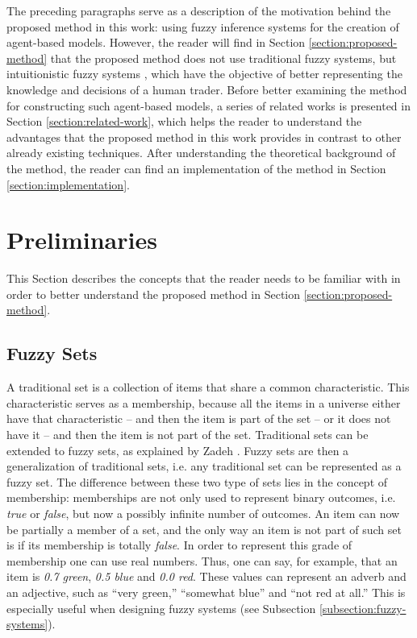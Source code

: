 \documentclass[review]{elsarticle}
\begin{document}
The preceding paragraphs serve as a description of the motivation behind the proposed method in this work: using fuzzy inference systems for the creation of agent-based models. However, the reader will find in Section \ref{section:proposed-method} that the proposed method does not use traditional fuzzy systems, but intuitionistic fuzzy systems \cite{Atanassov1986}, which have the objective of better representing the knowledge and decisions of a human trader. Before better examining the method for constructing such agent-based models, a series of related works is presented in Section \ref{section:related-work}, which helps the reader to understand the advantages that the proposed method in this work provides in contrast to other already existing techniques. After understanding the theoretical background of the method, the reader can find an implementation of the method in Section \ref{section:implementation}.
%

\section{Preliminaries}
\label{section:preliminaries}
%

This Section describes the concepts that the reader needs to be familiar with in order to better understand the proposed method in Section \ref{section:proposed-method}.%

\subsection{Fuzzy Sets}
\label{subsection:fuzzy-sets}

A traditional set is a collection of items that share a common characteristic. This characteristic serves as a membership, because all the items in a universe either have that characteristic -- and then the item is part of the set -- or it does not have it -- and then the item is not part of the set. Traditional sets can be extended to fuzzy sets, as explained by Zadeh \cite{Zadeh1965}. Fuzzy sets are then a generalization of traditional sets, i.e. any traditional set can be represented as a fuzzy set. The difference between these two type of sets lies in the concept of membership: memberships are not only used to represent binary outcomes, i.e. \textit{true} or \textit{false}, but now a possibly infinite number of outcomes. An item can now be partially a member of a set, and the only way an item is not part of such set is if its membership is totally \textit{false}. In order to represent this grade of membership one can use real numbers. Thus, one can say, for example, that an item is \textit{0.7 green}, \textit{0.5 blue} and \textit{0.0 red}. These values can represent an adverb and an adjective, such as ``very green,'' ``somewhat blue'' and ``not red at all.'' This is especially useful when designing fuzzy systems (see Subsection \ref{subsection:fuzzy-systems}).
\end{document}
